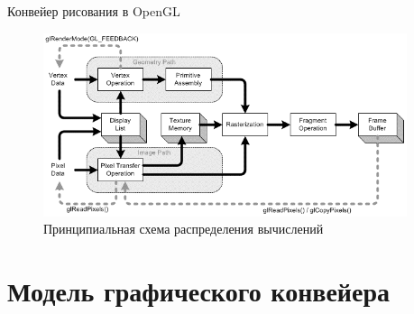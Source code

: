 \documentclass{beamer}
\begin{document}
\begin{frame}{Конвейер рисования в OpenGL}{}
	\begin{figure}
		\includegraphics[width=0.95\textwidth]{images/OpenGL_graphics_pipeline.png}
		\caption {Принципиальная схема распределения вычислений}
	\end{figure}
\end{frame}

\section{Модель графического конвейера}
\end{document}
